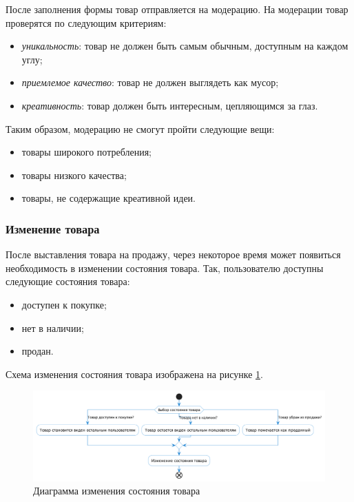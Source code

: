 \documentclass[a4paper,14pt]{extarticle}
\begin{document}
После заполнения формы товар отправляется на модерацию. На модерации товар проверятся по следующим критериям:
\begin{itemize}
    \item \textit{уникальность}: товар не должен быть самым обычным, доступным на каждом углу;
    \item \textit{приемлемое качество}: товар не должен выглядеть как мусор;
    \item \textit{креативность}: товар должен быть интересным, цепляющимся за глаз.
\end{itemize}
Таким образом, модерацию не смогут пройти следующие вещи:
\begin{itemize}
    \item товары широкого потребления;
    \item товары низкого качества;
    \item товары, не содержащие креативной идеи.
\end{itemize}

\subsubsection*{Изменение товара}

После выставления товара на продажу, через некоторое время может появиться необходимость в изменении состояния товара. Так, пользователю доступны следующие состояния товара:
\begin{itemize}
    \item доступен к покупке;
    \item нет в наличии;
    \item продан.
\end{itemize}
Схема изменения состояния товара изображена на рисунке \ref{fig:change_item}.

\begin{figure}[H]
    \centering
    \includegraphics[width=\textwidth]{images/change_item.png}
    \caption{Диаграмма изменения состояния товара}
    \label{fig:change_item}
\end{figure}
\end{document}
